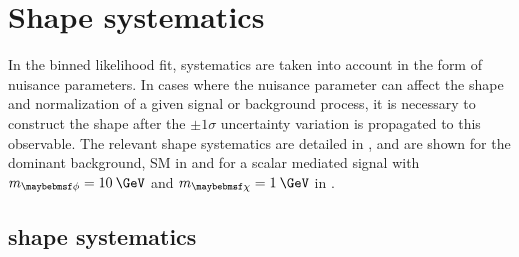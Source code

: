\chapter{Shape systematics}
\label{app:shape}

In the binned likelihood fit, systematics are taken into account in the form of nuisance parameters. In cases where the nuisance parameter can affect the \ptmiss shape and normalization of a given signal or background process, it is necessary to construct the \ptmiss shape after the $\pm 1\sigma$ uncertainty variation is propagated to this observable. The relevant shape systematics are detailed in , and are shown for the dominant background, SM \ttll in  and for a scalar mediated signal with $\mMed=10\:\GeV$ and $\mDM=1\:\GeV$ in .

\clearpage

\section{\ttll shape systematics}
\label{sec:tt2lsyst}

